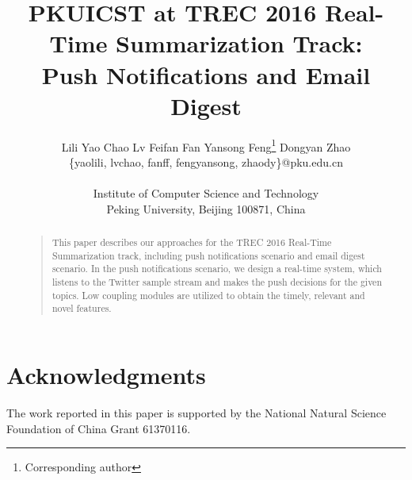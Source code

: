 \documentclass[letterpaper]{article}
\begin{document}
%
\title{PKUICST at TREC 2016 Real-Time Summarization Track: \\
Push Notifications and Email Digest
}
\author{Lili Yao \quad Chao Lv \quad Feifan Fan \quad Yansong Feng\footnote{Corresponding author} \quad Dongyan Zhao\\
\{yaolili, lvchao, fanff, fengyansong, zhaody\}@pku.edu.cn\\
\\
Institute of Computer Science and Technology\\
Peking University, Beijing 100871, China\\
}

\maketitle
\begin{abstract}
\begin{quote}
This paper describes our approaches for the TREC 2016 Real-Time Summarization track,
including push notifications scenario and email digest scenario.
In the push notifications scenario, we design a real-time system, which listens to the Twitter sample stream and makes the push decisions for the given topics.
Low coupling modules are utilized to obtain the timely, relevant and novel features.




\end{quote}
\end{abstract}






\section{Acknowledgments}
The work reported in this paper is supported by the National Natural Science Foundation of China Grant 61370116.
%



\end{document}
